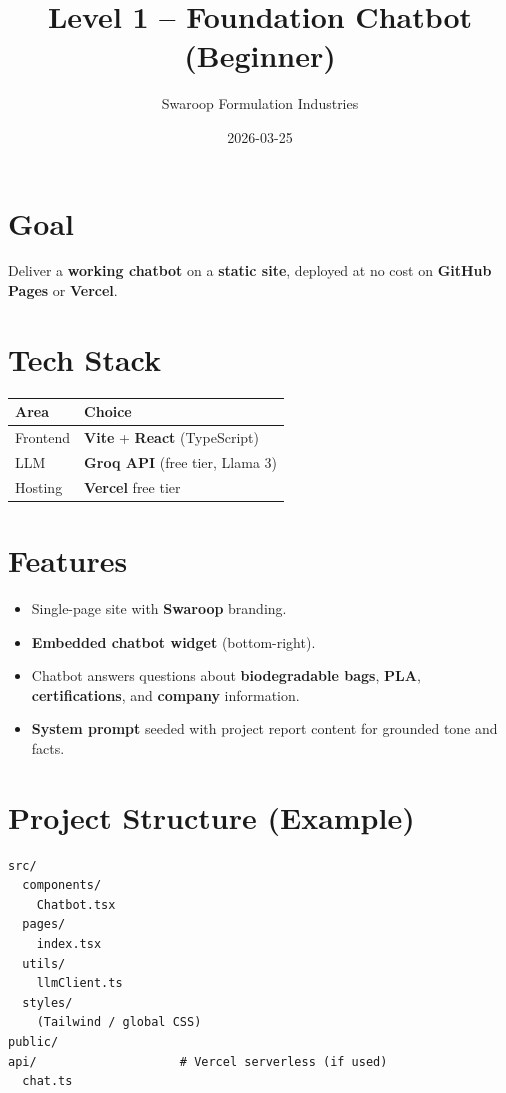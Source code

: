\documentclass{article}
\title{Level 1 -- Foundation Chatbot (Beginner)}
\author{Swaroop Formulation Industries}
\date{2026-03-25}
\begin{document}
\maketitle

\section{Goal}

Deliver a \textbf{working chatbot} on a \textbf{static site}, deployed at no cost on \textbf{GitHub Pages} or \textbf{Vercel}.

\section{Tech Stack}

\begin{tabular}{@{}ll@{}}
\toprule
\textbf{Area} & \textbf{Choice} \\
\midrule
Frontend & \textbf{Vite} + \textbf{React} (TypeScript) \\
LLM & \textbf{Groq API} (free tier, Llama 3) \\
Hosting & \textbf{Vercel} free tier \\
\bottomrule
\end{tabular}

\section{Features}

\begin{itemize}[leftmargin=*]
  \item Single-page site with \textbf{Swaroop} branding.
  \item \textbf{Embedded chatbot widget} (bottom-right).
  \item Chatbot answers questions about \textbf{biodegradable bags}, \textbf{PLA}, \textbf{certifications}, and \textbf{company} information.
  \item \textbf{System prompt} seeded with project report content for grounded tone and facts.
\end{itemize}

\section{Project Structure (Example)}

\begin{lstlisting}[language={},basicstyle=\ttfamily\footnotesize]
src/
  components/
    Chatbot.tsx
  pages/
    index.tsx
  utils/
    llmClient.ts
  styles/
    (Tailwind / global CSS)
public/
api/                    # Vercel serverless (if used)
  chat.ts
\end{lstlisting}
\end{document}
